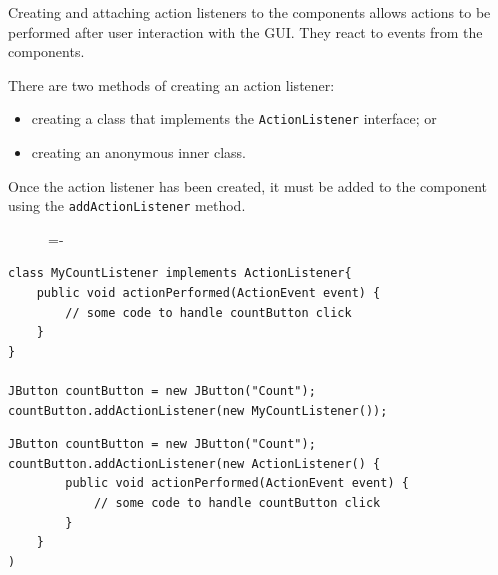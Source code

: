 \documentclass[a4paper]{systems-software}
\begin{document}
Creating and attaching action listeners to the components allows actions to be performed after user interaction with the GUI. They react to events from the components.

There are two methods of creating an action listener:
\begin{itemize}
	\item creating a class that implements the \texttt{ActionListener} interface; or
	\item creating an anonymous inner class.
\end{itemize}

Once the action listener has been created, it must be added to the component using the \texttt{addActionListener} method.

\begin{figure}[H]
	\lineskip=-\fboxrule
\end{figure}

\begin{lstlisting}[title={Creating an action listener by creating a class that implements the ActionListener interface.}]
class MyCountListener implements ActionListener{
	public void actionPerformed(ActionEvent event) {
		// some code to handle countButton click
	}
}

JButton countButton = new JButton("Count");
countButton.addActionListener(new MyCountListener());
\end{lstlisting}

\begin{lstlisting}[title={Creating an action listener by creating an anonymous inner class.}]
JButton countButton = new JButton("Count");
countButton.addActionListener(new ActionListener() {
		public void actionPerformed(ActionEvent event) {
			// some code to handle countButton click
		}
	}
)
\end{lstlisting}
\end{document}
